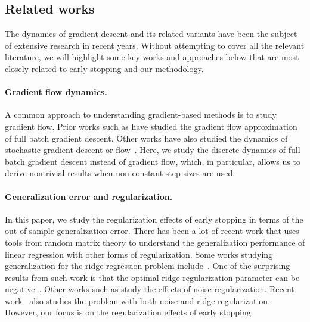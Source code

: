 \documentclass[11pt]{article}
\begin{document}
\subsection{Related works}

The dynamics of gradient descent and its related variants have been the subject of extensive research in recent years. Without attempting to cover all the relevant literature, we will highlight some key works and approaches below that are most closely related to early stopping and our methodology.

\paragraph{Gradient flow dynamics.}
A common approach to understanding gradient-based methods is to study gradient flow. Prior works such as \cite{SkGoBr1994, AdSaSo2020, ali2019continuous, levi2024grokking, shen2022optimal, boursier2025early} have studied the gradient flow approximation of full batch gradient descent. Other works have also studied the dynamics of stochastic gradient descent or flow~\cite{ali2020sgf, paquette2025homogenization, paquette2022sgd}. Here, we study the discrete dynamics of full batch gradient descent instead of gradient flow, which, in particular, allows us to derive nontrivial results when non-constant step sizes are used.

\paragraph{Generalization error and regularization.}
In this paper, we study the regularization effects of early stopping in terms of the out-of-sample generalization error. There has been a lot of recent work that uses tools from random matrix theory to understand the generalization performance of linear regression with other forms of regularization. Some works studying generalization for the ridge regression problem include~\cite{DobribanWager2018, HastieEtAl2022, kobak2020ridge, yilmaz2022regularization, nakkiran2021optimal, wang2024near, JacotEtAl2020, jacot2020implicit}. One of the surprising results from such work is that the optimal ridge regularization parameter can be negative~\cite{yilmaz2022regularization}. Other works such as \cite{sonthalia2023training, kausiklowrank2024, dhifallah2021noise, cui2023high} study the effects of noise regularization. Recent work~\cite{sonthalia2023under} also studies the problem with both noise and ridge regularization. However, our focus is on the regularization effects of early stopping.
\end{document}
